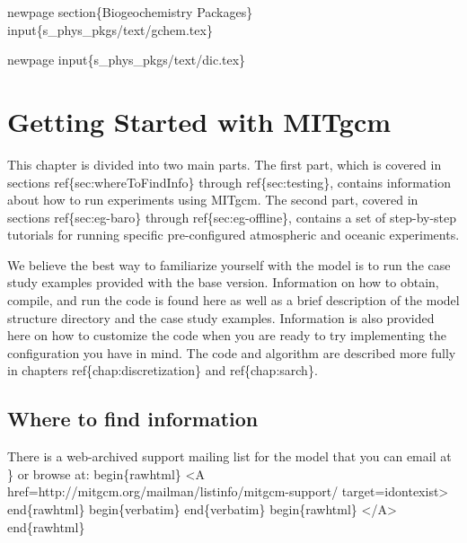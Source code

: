 \documentclass[letterpaper,10pt,english]{sphinxmanual}
\begin{document}
newpage
section\{Biogeochemistry Packages\}
input\{s\_phys\_pkgs/text/gchem.tex\}

newpage
input\{s\_phys\_pkgs/text/dic.tex\}


\chapter{Getting Started with MITgcm}
\label{\detokenize{getting_started/getting_started:getting-started-with-mitgcm}}\label{\detokenize{getting_started/getting_started:chap-getting-started}}\label{\detokenize{getting_started/getting_started::doc}}
This chapter is divided into two main parts. The first part, which is
covered in sections ref\{sec:whereToFindInfo\} through
ref\{sec:testing\}, contains information about how to run experiments
using MITgcm. The second part, covered in sections
ref\{sec:eg-baro\} through ref\{sec:eg-offline\}, contains a set of
step-by-step tutorials for running specific pre-configured atmospheric
and oceanic experiments.

We believe the best way to familiarize yourself with the
model is to run the case study examples provided with the base
version. Information on how to obtain, compile, and run the code is
found here as well as a brief description of the model structure
directory and the case study examples. Information is also provided
here on how to customize the code when you are ready to try implementing
the configuration you have in mind.  The code and algorithm
are described more fully in chapters ref\{chap:discretization\} and
ref\{chap:sarch\}.


\section{Where to find information}
\label{\detokenize{getting_started/getting_started:sec-wheretofindinfo}}\label{\detokenize{getting_started/getting_started:where-to-find-information}}
There is a web-archived support mailing list for the model that
you can email at \} or browse at:
begin\{rawhtml\} \textless{}A href=http://mitgcm.org/mailman/listinfo/mitgcm-support/ target=\sphinxquotedblright{}idontexist\sphinxquotedblright{}\textgreater{} end\{rawhtml\}
begin\{verbatim\}
end\{verbatim\}
begin\{rawhtml\} \textless{}/A\textgreater{} end\{rawhtml\}
\end{document}
